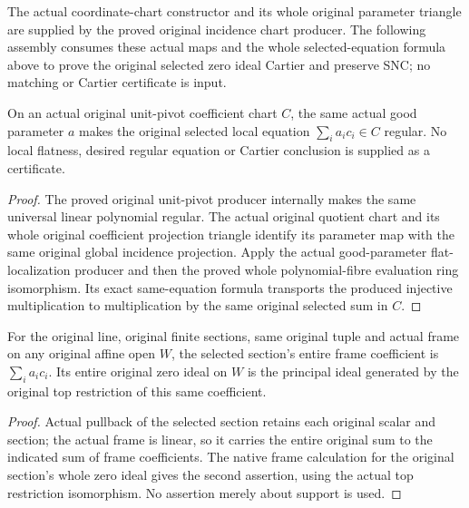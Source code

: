 The actual coordinate-chart constructor and its whole original parameter
triangle are supplied by the proved original incidence chart producer.
The following assembly consumes these actual maps and the whole
selected-equation formula above to prove the original selected zero ideal
Cartier and preserve SNC; no matching or Cartier certificate is input.


\begin{lemma}
\label{lem:kn-nadel-bertini-snc-flat-selected-coefficient}
\leanok
{}
On an actual original unit-pivot coefficient chart $C$, the same actual
good parameter $a$ makes the original selected local equation
$\sum_i a_i c_i\in C$ regular.  No local flatness, desired regular equation
or Cartier conclusion is supplied as a certificate.
\end{lemma}
\begin{proof}
The proved original unit-pivot producer internally makes the same
universal linear polynomial regular.  The actual original quotient chart
and its whole original coefficient projection triangle identify its
parameter map with the same original global incidence projection.
Apply the actual good-parameter flat-localization producer and then the
proved whole polynomial-fibre evaluation ring isomorphism.  Its exact
same-equation formula transports the produced injective multiplication
to multiplication by the same original selected sum in $C$.
\end{proof}

\begin{lemma}
\label{lem:kn-nadel-bertini-snc-flat-selected-frame}
\leanok
For the original line, original finite sections, same original tuple and
actual frame on any original affine open $W$, the selected section's
entire frame coefficient is $\sum_i a_i c_i$. Its entire original zero
ideal on $W$ is the principal ideal generated by the original top
restriction of this same coefficient.
\end{lemma}
\begin{proof}
Actual pullback of the selected section retains each original scalar and
section; the actual frame is linear, so it carries the entire original
sum to the indicated sum of frame coefficients. The native frame
calculation for the original section's whole zero ideal gives the second
assertion, using the actual top restriction isomorphism. No assertion
merely about support is used.
\end{proof}

